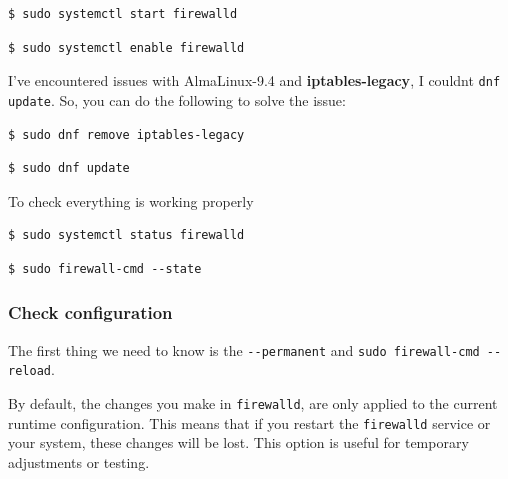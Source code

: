 \documentclass{article}
\newenvironment{blocktemplateIII}[1]{%
    \tcolorbox[beamer,%
    noparskip,breakable,
    ,colframe=Red,%
    colbacklower=LimeGreen!75!LightGreen,%
    title=#1]}%
    {\endtcolorbox}
\newenvironment{codetemplate}[1][]{%
  \mybasecolorbox[#1]
  \itshape
}{%
  \endmybasecolorbox
}
\begin{document}
\begin{codetemplate}
\begin{verbatim}
$ sudo systemctl start firewalld
\end{verbatim}
\end{codetemplate}

\begin{codetemplate}
\begin{verbatim}
$ sudo systemctl enable firewalld
\end{verbatim}
\end{codetemplate}

\begin{blocktemplateIII}{Warning}
I've encountered issues with AlmaLinux-9.4 and \textbf{iptables-legacy}, I couldnt \verb|dnf update|. So, you can do the following to solve the issue:
\begin{codetemplate}
\begin{verbatim}
$ sudo dnf remove iptables-legacy
\end{verbatim}
\end{codetemplate}
\begin{codetemplate}
\begin{verbatim}
$ sudo dnf update
\end{verbatim}
\end{codetemplate}
\end{blocktemplateIII}

To check everything is working properly
\begin{codetemplate}
\begin{verbatim}
$ sudo systemctl status firewalld
\end{verbatim}
\end{codetemplate}
\begin{codetemplate}
\begin{verbatim}
$ sudo firewall-cmd --state
\end{verbatim}
\end{codetemplate}

\subsubsection{Check configuration}

The first thing we need to know is the \verb|--permanent| and \verb|sudo firewall-cmd --reload|. 

By default, the changes you make in \verb|firewalld|, are only applied to the current runtime configuration. This means that if you restart the \verb|firewalld| service or your system, these changes will be lost. This option is useful for temporary adjustments or testing.
\end{document}
